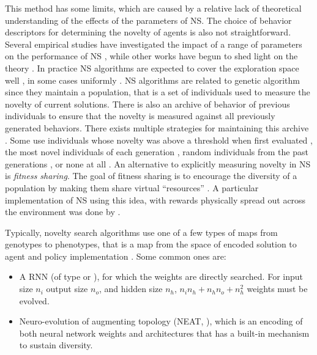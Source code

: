This method has some limits, which are caused by a relative lack of theoretical
understanding of the effects of the parameters of \ac{NS}. The choice of
behavior descriptors for determining the novelty of agents is also not
straightforward. Several empirical studies have investigated the impact of a
range of parameters on the performance of \ac{NS}
\parencite{gomesDevisingEffectiveNovelty2015,
  kistemakerCriticalFactorsPerformance2011}, while other works have begun to
shed light on the theory \parencite{doncieuxNoveltySearchTheoretical2019}. In
practice \ac{NS} algorithms are expected to cover the exploration space well
\parencite{cullyQualityDiversityOptimization2017,pughQualityDiversityNew2016},
in some cases uniformly \parencite{gomesDevisingEffectiveNovelty2015}. \ac{NS}
algorithms are related to genetic algorithm since they maintain a population,
that is a set of individuals used to measure the novelty of current solutions.
There is also an archive of behavior of previous individuals to ensure that the
novelty is measured against all previously generated behaviors. There exists
multiple strategies for maintaining this archive
\parencite{gomesDevisingEffectiveNovelty2015}. Some use individuals whose
novelty was above a threshold when first evaluated
\parencite{lehmanAbandoningObjectivesEvolution2011}, the most novel individuals
of each generation \parencite{liapisConstrainedNoveltySearch2015}, random
individuals from the past generations
\parencite{lehmanEfficientlyEvolvingPrograms2010}, or none at all
\parencite{mouretEncouragingBehavioralDiversity2012}. An alternative to
explicitly measuring novelty in \ac{NS} is \emph{fitness sharing}. The goal of
fitness sharing is to encourage the diversity of a population by making them
share virtual ``resources'' \parencite{goldbergSimpleGeneticAlgorithms1987,
  hollandAdaptationNaturalArtificial1992}. A particular implementation of
\ac{NS} using this idea, with rewards physically spread out across the
environment was done by \textcite{herelEmergenceNoveltyEvolutionary2022}.

Typically, novelty search algorithms use one of a few types of maps from
genotypes to phenotypes, that is a map from the space of encoded solution to
agent and policy implementation
\parencite{mouretEncouragingBehavioralDiversity2012}. Some common ones are:

\begin{itemize}
  \item A \ac{RNN} (of type \cite{elmanFindingStructureTime1990} or
        \cite{jordanSerialOrderParallel1997}), for which the weights are
        directly searched. For input size $n_{i}$ output size $n_{o}$, and
        hidden size $n_{h}$, $n_{i}n_{h} + n_{h}n_{o} + n_{h}^{2}$ weights must
        be evolved.
  \item Neuro-evolution of augmenting topology (NEAT,
        \cite{stanleyEvolvingNeuralNetworks2002}), which is an encoding of both
        neural network weights and architectures that has a built-in mechanism
        to sustain diversity.
\end{itemize}


